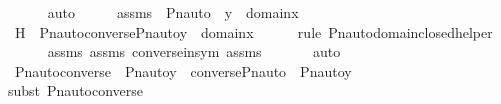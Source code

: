 \begin{isabellebody}
\ \ \ \ \isamarkupfalse%
\ auto\isanewline
{}\isamarkupfalse%
\ \isanewline
\ \ \isamarkupfalse%
\ assms{}\ {\isacharcolon}{\kern0pt}\ {\isachardoublequoteopen}Pn{\isacharunderscore}{\kern0pt}auto{\isacharparenleft}{\kern0pt}{\isasympi}{\isacharparenright}{\kern0pt}\ {\isacharbackquote}{\kern0pt}\ y\ {\isasymin}\ domain{\isacharparenleft}{\kern0pt}x{\isacharparenright}{\kern0pt}{\isachardoublequoteclose}\ \isanewline
\isanewline
\ \ \isamarkupfalse%
\ H\ {\isacharcolon}{\kern0pt}\ {\isachardoublequoteopen}Pn{\isacharunderscore}{\kern0pt}auto{\isacharparenleft}{\kern0pt}converse{\isacharparenleft}{\kern0pt}{\isasympi}{\isacharparenright}{\kern0pt}{\isacharparenright}{\kern0pt}{\isacharbackquote}{\kern0pt}{\isacharparenleft}{\kern0pt}Pn{\isacharunderscore}{\kern0pt}auto{\isacharparenleft}{\kern0pt}{\isasympi}{\isacharparenright}{\kern0pt}{\isacharbackquote}{\kern0pt}y{\isacharparenright}{\kern0pt}\ {\isasymin}\ domain{\isacharparenleft}{\kern0pt}x{\isacharparenright}{\kern0pt}{\isachardoublequoteclose}\ \isanewline
\ \ \ \ \isamarkupfalse%
{\isacharparenleft}{\kern0pt}rule\ Pn{\isacharunderscore}{\kern0pt}auto{\isacharunderscore}{\kern0pt}domain{\isacharunderscore}{\kern0pt}closed{\isacharunderscore}{\kern0pt}helper{\isacharparenright}{\kern0pt}\isanewline
\ \ \ \ \isamarkupfalse%
\ assms\ assms{}\ converse{\isacharunderscore}{\kern0pt}in{\isacharunderscore}{\kern0pt}sym\ assms\ \isanewline
\ \ \ \ \isamarkupfalse%
\ auto\isanewline
\ \ \isamarkupfalse%
\ {\isachardoublequoteopen}Pn{\isacharunderscore}{\kern0pt}auto{\isacharparenleft}{\kern0pt}converse{\isacharparenleft}{\kern0pt}{\isasympi}{\isacharparenright}{\kern0pt}{\isacharparenright}{\kern0pt}\ {\isacharbackquote}{\kern0pt}\ {\isacharparenleft}{\kern0pt}Pn{\isacharunderscore}{\kern0pt}auto{\isacharparenleft}{\kern0pt}{\isasympi}{\isacharparenright}{\kern0pt}{\isacharbackquote}{\kern0pt}y{\isacharparenright}{\kern0pt}\ {\isacharequal}{\kern0pt}\ converse{\isacharparenleft}{\kern0pt}Pn{\isacharunderscore}{\kern0pt}auto{\isacharparenleft}{\kern0pt}{\isasympi}{\isacharparenright}{\kern0pt}{\isacharparenright}{\kern0pt}\ {\isacharbackquote}{\kern0pt}\ {\isacharparenleft}{\kern0pt}Pn{\isacharunderscore}{\kern0pt}auto{\isacharparenleft}{\kern0pt}{\isasympi}{\isacharparenright}{\kern0pt}{\isacharbackquote}{\kern0pt}y{\isacharparenright}{\kern0pt}{\isachardoublequoteclose}\isanewline
\ \ \ \ \isamarkupfalse%
{\isacharparenleft}{\kern0pt}subst\ Pn{\isacharunderscore}{\kern0pt}auto{\isacharunderscore}{\kern0pt}converse{\isacharparenright}{\kern0pt}\isanewline

\end{isabellebody}
